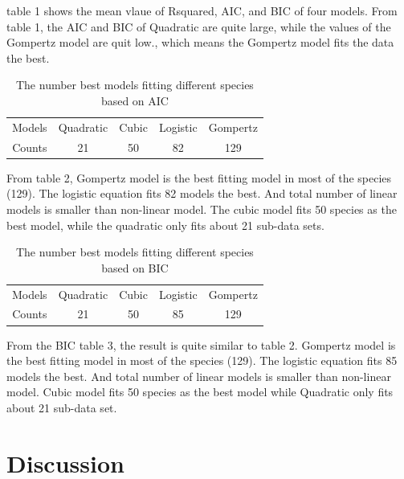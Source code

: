 \documentclass[11pt]{article}
\begin{document}
table 1 shows the mean vlaue of Rsquared, AIC, and BIC of four models. From table 1, the AIC and BIC of  Quadratic are quite large, while the values of the Gompertz model are quit low., which means the Gompertz model fits the data the best.
\begin{table}
    \centering
    \begin{tabular}{ccccc}
         Models&  Quadratic&  Cubic&  Logistic& Gompertz\\
         Counts&  21&  50&  82& 129\\
    \end{tabular}
    \caption{The number best models fitting different species based on AIC}
    \label{tab:my_label}
\end{table}

From table 2, Gompertz model is the best fitting model in most of the species (129). The logistic equation fits 82 models the best. And total number of linear models is smaller than non-linear model. The cubic model fits 50 species as the best model, while the quadratic only fits about 21 sub-data sets.
\begin{table}
    \centering
    \begin{tabular}{ccccc}
         Models&  Quadratic&  Cubic&  Logistic& Gompertz\\
         Counts&  21&  50&  85& 129\\
    \end{tabular}
    \caption{The number best models fitting different species based on BIC}
    \label{tab:my_label}
\end{table}

From the BIC table 3, the result is quite similar to  table 2. Gompertz model is the best fitting model in most of the species (129). The logistic equation fits 85 models the best. And total number of linear models is smaller than non-linear model. Cubic model fits 50 species as the best model while Quadratic only fits about 21 sub-data set.


\section{Discussion}
\end{document}
